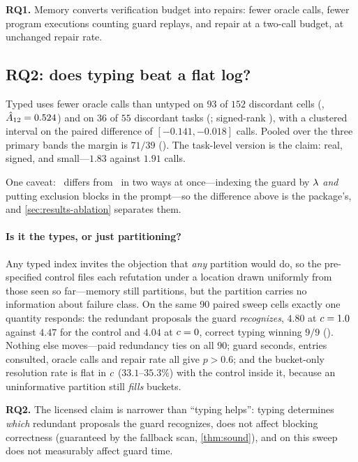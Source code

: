 \textbf{RQ1.} Memory converts verification budget into repairs: 
fewer oracle calls,  fewer program executions counting guard replays,
and  repair at a two-call budget, at unchanged repair rate.

\subsection{RQ2: does typing beat a flat log?}
\label{sec:results-typing}

Typed uses fewer oracle calls than untyped on $93$ of $152$ discordant cells
(, $\hat{A}_{12} = 0.524$) and on $36$ of $55$ discordant tasks
(; signed-rank ), with a clustered interval on the
paired difference of $[-0.141, -0.018]$ calls. Pooled over the three primary
bands the margin is $71/39$ (). The task-level version is the
claim: real, signed, and small---$1.83$ against $1.91$ calls.

One caveat: \armtyped\ differs from \armuntyped\ in two ways at once---indexing
the guard by $\lambda$ \emph{and} putting exclusion blocks in the prompt---so the
difference above is the package's, and \cref{sec:results-ablation} separates
them.

\paragraph{Is it the types, or just partitioning?}
Any typed index invites the objection that \emph{any} partition would do, so
the pre-specified control files each refutation under a location drawn
uniformly from those seen so far---memory still partitions, but the partition
carries no information about failure class. On the same \num{90} paired sweep
cells exactly one quantity responds: the redundant proposals the guard
\emph{recognizes}, $4.80$ at $c = 1.0$ against $4.47$ for the control and
$4.04$ at $c = 0$, correct typing winning $9/9$ (). Nothing else
moves---paid redundancy ties on all $90$; guard seconds, entries consulted,
oracle calls and repair rate all give $p > 0.6$; and the bucket-only resolution
rate is flat in $c$ ($33.1$--$35.3\%$) with the control inside it, because
an uninformative partition still \emph{fills} buckets.

\textbf{RQ2.} The licensed claim is narrower than ``typing helps'': typing
determines \emph{which} redundant proposals the guard recognizes, does not
affect blocking correctness (guaranteed by the fallback scan,
\cref{thm:sound}), and on this sweep does not measurably affect guard time.

